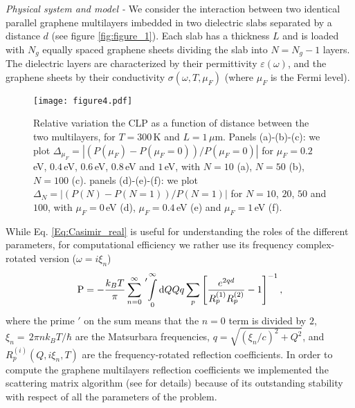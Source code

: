 \documentclass[aps,pra,superscriptaddress,amsmath,amssymb,showpacs,twocolumn,notitlepage]{revtex4-1}
\begin{document}
\emph{Physical system and model -}  We consider the interaction between two identical parallel graphene multilayers imbedded in two dielectric slabs  separated by a distance $d$ (see figure \ref{fig:figure_1}). Each slab has a thickness $L$ and is loaded with $N_g$ equally spaced graphene sheets dividing the slab into $N=N_g-1$ layers. The dielectric layers are characterized by their permittivity $\varepsilon(\omega)$, and the graphene sheets by their conductivity $\sigma(\omega,T,\mu_F)$ (where $\mu_F$ is the Fermi level).  

\begin{figure}[!ht]
\texttt{[image: figure4.pdf]}
\caption{\footnotesize Relative variation the CLP as a function of distance between the two multilayers, for $T=300\,$K and $L=1\,\mu$m. Panels (a)-(b)-(c): we plot $\Delta_{\mu_F}=\left| \left(P(\mu_F)-P(\mu_F=0)\right)/P(\mu_F=0) \right|$ for $\mu_F=0.2\,$eV, $0.4\,$eV, $0.6\,$eV, $0.8\,$eV and $1\,$eV, with $N=10$ (a), $N=50$ (b), $N=100$ (c). panels (d)-(e)-(f): we plot  $\Delta_{N}=\left| \left(P(N)-P(N=1)\right)/P(N=1) \right|$ for $N=10$, $20$, $50$ and $100$, with $\mu_F=0\,$eV (d), $\mu_F=0.4\,$eV (e) and $\mu_F=1\,$eV (f).\label{fig:figure_4}} 
\end{figure}

While Eq. \eqref{Eq:Casimir_real} is useful for understanding the roles of the different parameters, for computational efficiency we rather use its frequency complex-rotated version  ($\omega=i\xi_n$) \cite{DLP61}    
%
\begin{equation}\label{Eq:Casimir}
\textrm{P}=-\frac{k_BT}{\pi}  \sum_{n=0}^{\infty}\sideset{'}{}\int_0^{\infty}\textrm{d}QQq\sum_{p}\left[ \frac{e^{2 q d}}{ R_p^{(1)}R_p^{(2)}}-1 \right]^{-1},
\end{equation}
%
where the prime ${\prime}$ on the sum means that the $n=0$ term is divided by $2$, $\xi_n= \,2\pi n k_B T /\hbar$ are the Matsurbara frequencies, $q  = \sqrt{(\xi_n/c)^2+Q^2}$,  and $R_p^{(i)}(Q,i\xi_n,T)$ are the frequency-rotated reflection coefficients. In order to compute the graphene multilayers reflection coefficients  we implemented the scattering matrix algorithm (see \cite{SuppMat} for details) because of its outstanding stability with respect of all the parameters of the problem.      
\end{document}
